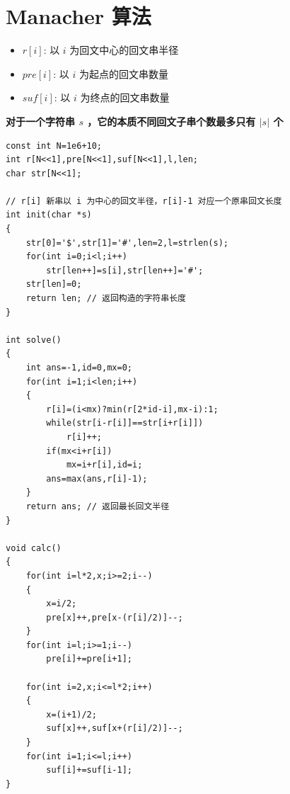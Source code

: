 \section{Manacher 算法}
\begin{itemize}
    \item $r[i]$: 以 $i$ 为回文中心的回文串半径
    \item $pre[i]$: 以 $i$ 为起点的回文串数量
    \item $suf[i]$: 以 $i$ 为终点的回文串数量
\end{itemize}
\textbf{对于一个字符串 $s$ ，它的本质不同回文子串个数最多只有 $|s|$ 个}
\begin{verbatim}
const int N=1e6+10;
int r[N<<1],pre[N<<1],suf[N<<1],l,len;
char str[N<<1];

// r[i] 新串以 i 为中心的回文半径，r[i]-1 对应一个原串回文长度
int init(char *s)
{
    str[0]='$',str[1]='#',len=2,l=strlen(s);
    for(int i=0;i<l;i++)
        str[len++]=s[i],str[len++]='#';
    str[len]=0;
    return len; // 返回构造的字符串长度
}

int solve()
{
    int ans=-1,id=0,mx=0;
    for(int i=1;i<len;i++)
    {
        r[i]=(i<mx)?min(r[2*id-i],mx-i):1;
        while(str[i-r[i]]==str[i+r[i]])
            r[i]++;
        if(mx<i+r[i])
            mx=i+r[i],id=i;
        ans=max(ans,r[i]-1);
    }
    return ans; // 返回最长回文半径
}

void calc()
{
    for(int i=l*2,x;i>=2;i--)
    {
        x=i/2;
        pre[x]++,pre[x-(r[i]/2)]--;
    }
    for(int i=l;i>=1;i--)
        pre[i]+=pre[i+1];

    for(int i=2,x;i<=l*2;i++)
    {
        x=(i+1)/2;
        suf[x]++,suf[x+(r[i]/2)]--;
    }
    for(int i=1;i<=l;i++)
        suf[i]+=suf[i-1];
}
\end{verbatim}